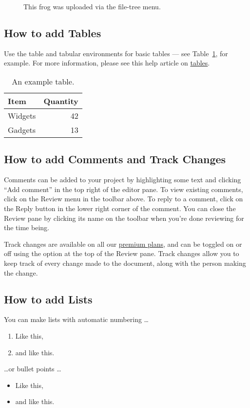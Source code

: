 \documentclass{article}
\begin{document}
\begin{figure}
\centering
\caption{\label{fig:frog0}This frog was uploaded via the file-tree menu.}
\end{figure}

\subsection{How to add Tables}

Use the table and tabular environments for basic tables --- see Table~\ref{tab:widgets}, for example. For more information, please see this help article on \href{https://www.overleaf.com/learn/latex/tables}{tables}. 

\begin{table}
\centering
\begin{tabular}{l|r}
Item & Quantity \\\hline
Widgets & 42 \\
Gadgets & 13
\end{tabular}
\caption{\label{tab:widgets}An example table.}
\end{table}

\subsection{How to add Comments and Track Changes}

Comments can be added to your project by highlighting some text and clicking ``Add comment'' in the top right of the editor pane. To view existing comments, click on the Review menu in the toolbar above. To reply to a comment, click on the Reply button in the lower right corner of the comment. You can close the Review pane by clicking its name on the toolbar when you're done reviewing for the time being.

Track changes are available on all our \href{https://www.overleaf.com/user/subscription/plans}{premium plans}, and can be toggled on or off using the option at the top of the Review pane. Track changes allow you to keep track of every change made to the document, along with the person making the change. 

\subsection{How to add Lists}

You can make lists with automatic numbering \dots

\begin{enumerate}
\item Like this,
\item and like this.
\end{enumerate}
\dots or bullet points \dots
\begin{itemize}
\item Like this,
\item and like this.
\end{itemize}
\end{document}
